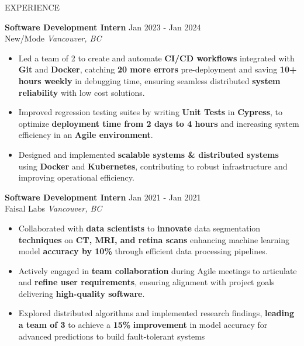 \documentclass{resume} %
\begin{document}
\begin{rSection}{EXPERIENCE}

\textbf{Software Development Intern} \hfill Jan 2023 - Jan 2024\\
New/Mode \hfill \textit{Vancouver, BC}
 \begin{itemize}
    \itemsep -3pt {} 
    
\item Led a team of 2 to create and automate \textbf{CI/CD workflows} integrated with \textbf{Git} and \textbf{Docker}, catching \textbf{20%
more errors} pre-deployment and saving \textbf{10+ hours weekly} in debugging time, ensuring seamless distributed
\textbf{system reliability} with low cost solutions.

\item Improved regression testing suites by writing \textbf{Unit Tests} in \textbf{Cypress}, to optimize \textbf{deployment time from 2
days to 4 hours} and increasing system efficiency in an \textbf{Agile environment}.

\item Designed and implemented \textbf{scalable systems \& distributed systems} using \textbf{Docker} and \textbf{Kubernetes}, contributing to robust infrastructure and improving operational efficiency.



\end{itemize}
 
\textbf{Software Development Intern} \hfill Jan 2021 - Jan 2021\\
Faisal Labs \hfill \textit{Vancouver, BC}
 \begin{itemize}
    \itemsep -3pt {} 
    
\item Collaborated with \textbf{data scientists} to \textbf{innovate} data segmentation \textbf{techniques} on \textbf{CT, MRI, and retina scans}
enhancing machine learning model \textbf{accuracy by 10\%} through efficient data processing pipelines.
\item Actively engaged in \textbf{team collaboration} during Agile meetings to articulate and \textbf{refine user requirements},
ensuring alignment with project goals delivering \textbf{high-quality software}.

\item Explored distributed algorithms and implemented research findings, \textbf{leading a team of 3 }to achieve a \textbf{15\%}
\textbf{improvement} in model accuracy for advanced predictions to build fault-tolerant systems


\end{itemize}

\end{rSection} 
\end{document}
